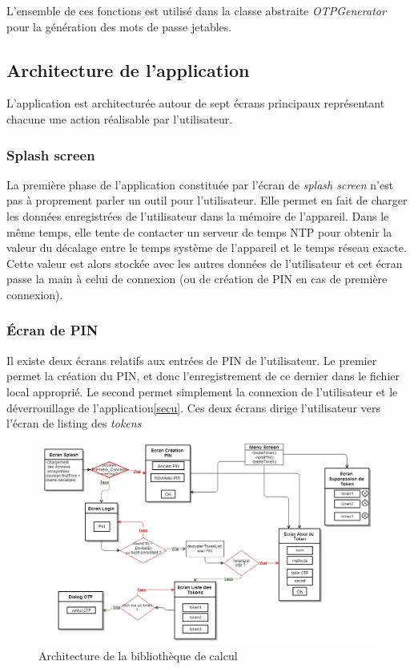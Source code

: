 L'ensemble de ces fonctions est utilisé dans la classe abstraite \emph{OTPGenerator} pour la
génération des mots de passe jetables.

\subsection{Architecture de l'application}

L'application est architecturée autour de sept écrans principaux représentant chacune une 
action réalisable par l'utilisateur. 

\subsubsection{Splash screen}
La première phase de l'application constituée par l'écran de \emph{splash screen} n'est pas à proprement parler un outil pour l'utilisateur. Elle permet
en fait de charger les données enregistrées de l'utilisateur dans la mémoire de l'appareil. Dans le même temps, elle tente de contacter un serveur de temps NTP pour obtenir la valeur
du décalage entre le temps système de l'appareil et le temps réseau exacte. Cette valeur est
alors stockée avec les autres données de l'utilisateur et cet écran passe la main à celui
de connexion (ou de création de PIN en cas de première connexion).

\subsubsection{Écran de PIN}
Il existe deux écrans relatifs aux entrées de PIN de l'utilisateur. Le premier permet la création
du PIN, et donc l'enregistrement de ce dernier dans le fichier local approprié. Le second permet 
simplement la connexion de l'utilisateur et le déverrouillage de l'application\ref{secu}. Ces deux
écrans dirige l'utilisateur vers l'écran de listing des \emph{tokens} 


\begin{figure}
  \centering
  \includegraphics[scale=0.4]{../graphics/archi-android.jpg}
  \caption{Architecture de la bibliothèque de calcul}
  \label{fig:umlLib}
\end{figure}

